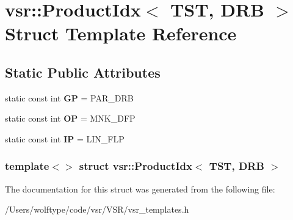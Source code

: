 \hypertarget{structvsr_1_1_product_idx_3_01_t_s_t_00_01_d_r_b_01_4}{\section{vsr\-:\-:Product\-Idx$<$ T\-S\-T, D\-R\-B $>$ Struct Template Reference}
\label{structvsr_1_1_product_idx_3_01_t_s_t_00_01_d_r_b_01_4}
}
\subsection*{Static Public Attributes}
\begin{DoxyCompactItemize}
\item 
\hypertarget{structvsr_1_1_product_idx_3_01_t_s_t_00_01_d_r_b_01_4_abe306f62d209b5cfe92ce88c07a11b4a}{static const int {\bfseries G\-P} = P\-A\-R\-\_\-\-D\-R\-B}\label{structvsr_1_1_product_idx_3_01_t_s_t_00_01_d_r_b_01_4_abe306f62d209b5cfe92ce88c07a11b4a}

\item 
\hypertarget{structvsr_1_1_product_idx_3_01_t_s_t_00_01_d_r_b_01_4_a8f8310a70708b89b3ca72e1630256fa6}{static const int {\bfseries O\-P} = M\-N\-K\-\_\-\-D\-F\-P}\label{structvsr_1_1_product_idx_3_01_t_s_t_00_01_d_r_b_01_4_a8f8310a70708b89b3ca72e1630256fa6}

\item 
\hypertarget{structvsr_1_1_product_idx_3_01_t_s_t_00_01_d_r_b_01_4_a689d1ed69cf4c4fc62c203aeacc27581}{static const int {\bfseries I\-P} = L\-I\-N\-\_\-\-F\-L\-P}\label{structvsr_1_1_product_idx_3_01_t_s_t_00_01_d_r_b_01_4_a689d1ed69cf4c4fc62c203aeacc27581}

\end{DoxyCompactItemize}
\subsubsection*{template$<$$>$ struct vsr\-::\-Product\-Idx$<$ T\-S\-T, D\-R\-B $>$}



The documentation for this struct was generated from the following file\-:\begin{DoxyCompactItemize}
\item 
/\-Users/wolftype/code/vsr/\-V\-S\-R/vsr\-\_\-templates.\-h\end{DoxyCompactItemize}
